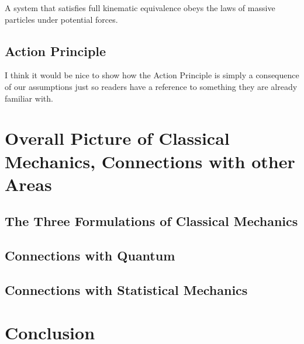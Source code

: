 \documentclass{article}
\begin{document}
\begin{prop}
	A system that satisfies full kinematic equivalence obeys the laws of massive particles under potential forces.
\end{prop}
	

\subsection{Action Principle}

I think it would be nice to show how the Action Principle is simply a consequence of our assumptions just so readers have a reference to something they are already familiar with.

\section{Overall Picture of Classical Mechanics, Connections with other Areas} 

\subsection{The Three Formulations of Classical Mechanics}

\subsection{Connections with Quantum}

\subsection{Connections with Statistical Mechanics}


\section{Conclusion}
	
\end{document}
